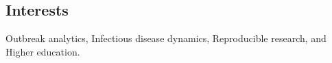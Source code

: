 \documentclass[margin,line]{res}
\begin{document}
\begin{resume}

\vspace*{.15in}

\section{\sc Interests}%

Outbreak analytics, Infectious disease dynamics, Reproducible research, and Higher education.






\end{resume}
\end{document}
